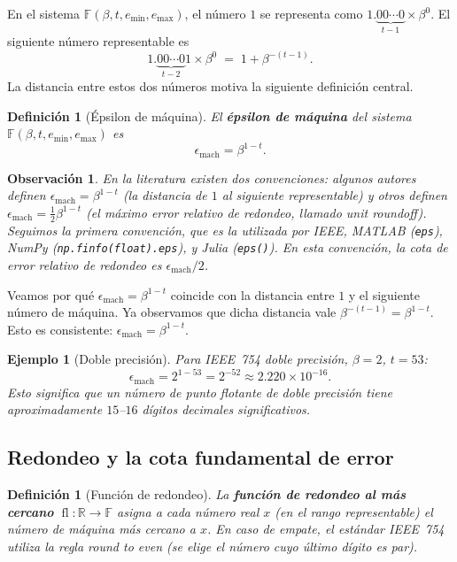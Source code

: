 \documentclass[a4paper,11pt]{report}
\newtheorem{definition}[theorem]{Definición}
\newtheorem{example}[theorem]{Ejemplo}
\newtheorem{remark}[theorem]{Observación}
\begin{document}
En el sistema $\mathbb{F}(\beta,t,e_{\min},e_{\max})$, el número $1$ se representa como $1.\underbrace{00\cdots 0}_{t-1} \times \beta^0$. El siguiente número representable es
\[
1.\underbrace{00\cdots 0}_{t-2}1 \times \beta^0 \;=\; 1 + \beta^{-(t-1)}.
\]
La distancia entre estos dos números motiva la siguiente definición central.

\begin{definition}[Épsilon de máquina]\label{def:epsilon_maquina}
El \textbf{épsilon de máquina} del sistema $\mathbb{F}(\beta,t,e_{\min},e_{\max})$ es
\[
\boxed{\epsilon_{\text{mach}} = \beta^{1-t}.}
\]
\end{definition}

\begin{remark}
En la literatura existen dos convenciones: algunos autores definen $\epsilon_{\text{mach}} = \beta^{1-t}$ (la distancia de $1$ al siguiente representable) y otros definen $\epsilon_{\text{mach}} = \tfrac{1}{2}\beta^{1-t}$ (el máximo error relativo de redondeo, llamado \textit{unit roundoff}).  Seguimos la primera convención, que es la utilizada por IEEE, MATLAB (\texttt{eps}), NumPy (\texttt{np.finfo(float).eps}), y Julia (\texttt{eps()}).  En esta convención, la cota de error relativo de redondeo es $\epsilon_{\text{mach}}/2$.
\end{remark}

Veamos por qué $\epsilon_{\text{mach}} = \beta^{1-t}$ coincide con la distancia entre $1$ y el siguiente número de máquina.  
Ya observamos que dicha distancia vale $\beta^{-(t-1)} = \beta^{1-t}$.  
Esto es consistente: $\epsilon_{\text{mach}} = \beta^{1-t}$.

\begin{example}[Doble precisión]
Para IEEE~754 doble precisión, $\beta=2$, $t=53$:
\[
\epsilon_{\text{mach}} = 2^{1-53} = 2^{-52} \approx 2.220\times 10^{-16}.
\]
Esto significa que un número de punto flotante de doble precisión tiene aproximadamente $15$--$16$ dígitos decimales significativos.
\end{example}

\subsection{Redondeo y la cota fundamental de error}\label{subsec:cota_fundamental}

\begin{definition}[Función de redondeo]\label{def:redondeo}
La \textbf{función de redondeo al más cercano} $\operatorname{fl}\colon\mathbb{R}\to\mathbb{F}$ asigna a cada número real $x$ (en el rango representable) el número de máquina más cercano a $x$.  En caso de empate, el estándar IEEE~754 utiliza la regla \textit{round to even} (se elige el número cuyo último dígito es par).
\end{definition}
\end{document}

